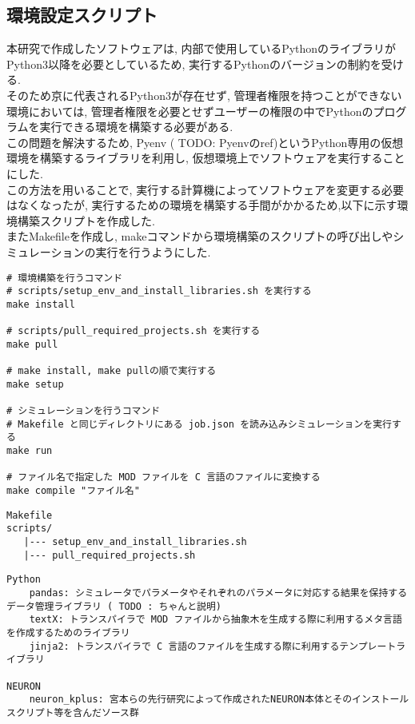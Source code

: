 \subsection{環境設定スクリプト}
本研究で作成したソフトウェアは, 内部で使用しているPythonのライブラリがPython3以降を必要としているため,
実行するPythonのバージョンの制約を受ける.\\
そのため京に代表されるPython3が存在せず, 管理者権限を持つことができない環境においては,
管理者権限を必要とせずユーザーの権限の中でPythonのプログラムを実行できる環境を構築する必要がある.\\
この問題を解決するため, Pyenv ( TODO: Pyenvのref)というPython専用の仮想環境を構築するライブラリを利用し,
仮想環境上でソフトウェアを実行することにした.\\
この方法を用いることで, 実行する計算機によってソフトウェアを変更する必要はなくなったが,
実行するための環境を構築する手間がかかるため,以下に示す環境構築スクリプトを作成した.\\
またMakefileを作成し, makeコマンドから環境構築のスクリプトの呼び出しやシミュレーションの実行を行うようにした.\\
{\footnotesize
\begin{lstlisting}[numbers=none, caption=利用するmakeコマンド]
# 環境構築を行うコマンド
# scripts/setup_env_and_install_libraries.sh を実行する
make install

# scripts/pull_required_projects.sh を実行する
make pull

# make install, make pullの順で実行する
make setup

# シミュレーションを行うコマンド
# Makefile と同じディレクトリにある job.json を読み込みシミュレーションを実行する
make run

# ファイル名で指定した MOD ファイルを C 言語のファイルに変換する
make compile "ファイル名"
\end{lstlisting}
}

{\footnotesize
\begin{lstlisting}[numbers=none, caption=環境構築スクリプトのフォルダ構成]
Makefile
scripts/
   |--- setup_env_and_install_libraries.sh
   |--- pull_required_projects.sh
\end{lstlisting}
}

{\footnotesize
\begin{lstlisting}[numbers=none, caption=必要なライブラリ]
Python
    pandas: シミュレータでパラメータやそれぞれのパラメータに対応する結果を保持するデータ管理ライブラリ ( TODO : ちゃんと説明)
    textX: トランスパイラで MOD ファイルから抽象木を生成する際に利用するメタ言語を作成するためのライブラリ
    jinja2: トランスパイラで C 言語のファイルを生成する際に利用するテンプレートライブラリ

NEURON
    neuron_kplus: 宮本らの先行研究によって作成されたNEURON本体とそのインストールスクリプト等を含んだソース群
\end{lstlisting}
}

{\footnotesize

}

{\footnotesize

}
